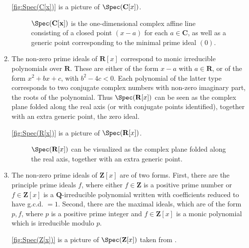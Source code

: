 \begin{solution}
\begin{enumerate}
\autoref{fig:Spec(C[x])} is a picture of \(\Spec(\mathbf{C}[x])\).

\begin{figure}
\centering

\caption{%
\(\Spec(\mathbf{C[x]})\) is the one-dimensional complex affine line consisting of a closed point \((x - a)\) for each \(a \in \mathbf{C}\), as well as a generic point corresponding to the minimal prime ideal \((0)\).%
}
\label{fig:Spec(C[x])}
\end{figure}

\item
The non-zero prime ideals of \(\mathbf R[x]\) correspond to monic irreducible polynomials over \(\mathbf R\).
These are either of the form \(x - a\) with \(a \in \mathbf R\), or of the form \(x^2 + bx + c\), with \(b^2 - 4c < 0\).
Each polynomial of the latter type corresponds to two conjugate complex numbers with non-zero imaginary part, the roots of the polynomial.
Thus \(\Spec(\mathbf R[x])\) can be seen as the complex plane folded along the real axis (or with conjugate points identified), together with an extra generic point, the zero ideal.

\autoref{fig:Spec(R[x])} is a picture of \(\Spec(\mathbf{R}[x])\).

\begin{figure}
\centering

\caption{%
\(\Spec(\mathbf{R}[x])\) can be visualized as the complex plane folded along the real axis, together with an extra generic point.%
}
\label{fig:Spec(R[x])}
\end{figure}

\item
The non-zero prime ideals of \(\mathbf{Z}[x]\) are of two forms.
First, there are the principle prime ideals \(f\), where either \(f \in \mathbf{Z}\) is a positive prime number or \(f \in \mathbf{Z}[x]\) is a \(\mathbf{Q}\)-irreducible polynomial written with coefficients reduced to have g.c.d. \(= 1\).
Second, there are the maximal ideals, which are of the form \(p, f\), where \(p\) is a positive prime integer and \(f \in \mathbf{Z}[x]\) is a monic polynomial which is irreducible modulo \(p\).

\autoref{fig:Spec(Z[x])} is a picture of \(\Spec(\mathbf{Z}[x])\) taken from \cite[Chapter~2, \S1, Example~H]{MumfordRedBook}.


\end{enumerate}
\end{solution}

